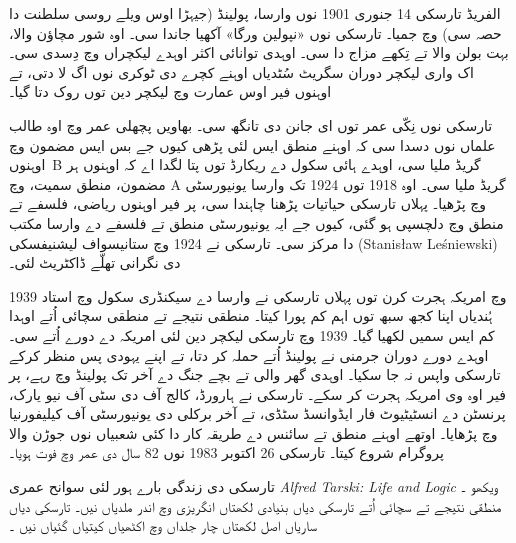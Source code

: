 \documentclass[../../../include/open-logic-section]{subfiles}
\begin{document}



الفریڈ تارسکی 14 جنوری 1901 نوں وارسا، پولینڈ (جیہڑا اوس ویلے روسی سلطنت دا حصہ سی) وچ جمیا۔ تارسکی نوں «نپولین ورگا» آکھیا جاندا سی۔ اوہ شور مچاؤن والا، بہت بولن والا تے تِکھے مزاج دا سی۔ اوہدی توانائی اکثر اوہدے لیکچراں وچ دِسدی سی۔ اک واری لیکچر دوران سگریٹ سُٹدیاں اوہنے کچرے دی ٹوکری نوں اگ لا دتی، تے اوہنوں فیر اوس عمارت وچ لیکچر دین توں روک دتا گیا۔

تارسکی نوں نِکّی عمر توں ای جانن دی تانگھ سی۔ بھاویں پچھلی عمر وچ اوہ طالب علماں نوں دسدا سی کہ اوہنے منطق ایس لئی پڑھی کیوں جے بس ایس مضمون وچ اوہنوں~B گریڈ ملیا سی، اوہدے ہائی سکول دے ریکارڈ توں پتا لگدا اے کہ اوہنوں ہر مضمون، منطق سمیت، وچ A گریڈ ملیا سی۔ اوہ 1918 توں 1924 تک وارسا یونیورسٹی وچ پڑھیا۔ پہلاں تارسکی حیاتیات پڑھنا چاہندا سی، پر فیر اوہنوں ریاضی، فلسفے تے منطق وچ دلچسپی ہو گئی، کیوں جے ایہ یونیورسٹی منطق تے فلسفے دے وارسا مکتب دا مرکز سی۔ تارسکی نے 1924 وچ ستانیسواف لیشنیفسکی (Stanis\l{}aw Le\'{s}niewski) دی نگرانی تھلّے ڈاکٹریٹ لئی۔

1939 وچ امریکہ ہجرت کرن توں پہلاں تارسکی نے وارسا دے سیکنڈری سکول وچ استاد ہُندیاں اپنا کجھ سبھ توں اہم کم پورا کیتا۔ منطقی نتیجے تے منطقی سچائی اُتے اوہدا کم ایس سمیں لکھیا گیا۔ 1939 وچ تارسکی لیکچر دین لئی امریکہ دے دورے اُتے سی۔ اوہدے دورے دوران جرمنی نے پولینڈ اُتے حملہ کر دتا، تے اپنے یہودی پس منظر کرکے تارسکی واپس نہ جا سکیا۔ اوہدی گھر والی تے بچے جنگ دے آخر تک پولینڈ وچ رہے، پر فیر اوہ وی امریکہ ہجرت کر سکے۔ تارسکی نے ہارورڈ، کالج آف دی سٹی آف نیو یارک، پرنسٹن دے انسٹیٹیوٹ فار ایڈوانسڈ سٹڈی، تے آخر برکلی دی یونیورسٹی آف کیلیفورنیا وچ پڑھایا۔ اوتھے اوہنے منطق تے سائنس دے طریقہ کار دا کئی شعبیاں نوں جوڑن والا پروگرام شروع کیتا۔ تارسکی 26 اکتوبر 1983 نوں 82 سال دی عمر وچ فوت ہویا۔

\begin{reading}
تارسکی دی زندگی بارے ہور لئی سوانح عمری \emph{Alfred Tarski: Life
  and Logic} ویکھو \citep{Feferman2004}۔ منطقی نتیجے تے سچائی اُتے تارسکی دیاں بنیادی لکھتاں انگریزی وچ \citep{Tarski1983} اندر ملدیاں نیں۔ تارسکی دیاں ساریاں اصل لکھتاں چار جلداں وچ اکٹھیاں کیتیاں گئیاں نیں \citep{Tarski1981}۔
\end{reading}
\end{document}

